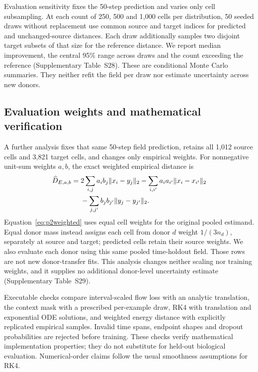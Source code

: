 \documentclass[10pt,a4paper]{article}
\begin{document}
Evaluation sensitivity fixes the 50-step prediction and varies only cell subsampling. At each count of 250, 500 and 1,000 cells per distribution, 50 seeded draws without replacement use common source and target indices for predicted and unchanged-source distances. Each draw additionally samples two disjoint target subsets of that size for the reference distance. We report median improvement, the central 95\% range across draws and the count exceeding the reference (Supplementary Table~S28). These are conditional Monte Carlo summaries. They neither refit the field per draw nor estimate uncertainty across new donors.

\subsection{Evaluation weights and mathematical verification}
A further analysis fixes that same 50-step field prediction, retains all 1,012 source cells and 3,821 target cells, and changes only empirical weights. For nonnegative unit-sum weights $a,b$, the exact weighted empirical distance is
\begin{align}
\widehat D_{E,a,b}={}&2\sum_{i,j}a_i b_j\|x_i-y_j\|_2
-\sum_{i,i'}a_i a_{i'}\|x_i-x_{i'}\|_2\notag\\
&-\sum_{j,j'}b_jb_{j'}\|y_j-y_{j'}\|_2.\label{eq:p2weighted}
\end{align}
Equation~\eqref{eq:p2weighted} uses equal cell weights for the original pooled estimand. Equal donor mass instead assigns each cell from donor $d$ weight $1/(3n_d)$, separately at source and target; predicted cells retain their source weights. We also evaluate each donor using this same pooled time-holdout field. Those rows are not new donor-transfer fits. This analysis changes neither scaling nor training weights, and it supplies no additional donor-level uncertainty estimate (Supplementary Table~S29).

Executable checks compare interval-scaled flow loss with an analytic translation, the context mask with a prescribed per-example draw, RK4 with translation and exponential ODE solutions, and weighted energy distance with explicitly replicated empirical samples. Invalid time spans, endpoint shapes and dropout probabilities are rejected before training. These checks verify mathematical implementation properties; they do not substitute for held-out biological evaluation. Numerical-order claims follow the usual smoothness assumptions for RK4.
\end{document}
